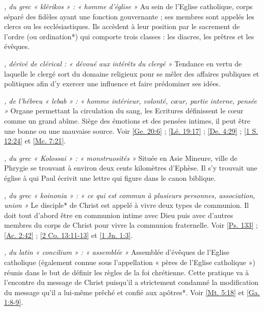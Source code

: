 \begin{multicols}{2}
\textit{, du grec « klêrikos » : « homme d'église »}\newline
Au sein de l'Eglise catholique, corps séparé des fidèles ayant une fonction gouvernante ; ses membres sont appelés les clercs ou les ecclésiastiques. Ils accèdent à leur position par le sacrement de l'ordre (ou ordination*) qui comporte trois classes : les diacres, les prêtres et les évêques.

\textit{, dérivé de clérical : « dévoué aux intérêts du clergé »}\newline
Tendance en vertu de laquelle le clergé sort du domaine religieux pour se mêler des affaires publiques et politiques afin d'y exercer une influence et faire prédominer ses idées.

\textit{, de l'hébreu « lebab » : « homme intérieur, volonté, cœur, partie interne, pensée »}\newline
Organe permettant la circulation du sang, les Ecritures définissent le cœur comme un grand abîme. Siège des émotions et des pensées intimes, il peut être une bonne ou une mauvaise source. Voir \vref{Ge. 20:6} ; \vref{Lé. 19:17} ; \vref{De. 4:29} ; \vref{1 S. 12:24} et \vref{Mc. 7:21}.

\textit{, du grec « Kolossai » : « monstruosités »}\newline
Située en Asie Mineure, ville de Phrygie se trouvant à environ deux cents kilomètres d'Ephèse. Il s'y trouvait une église à qui Paul écrivit une lettre qui figure dans le canon biblique.

\textit{, du grec « koinonia » : « ce qui est commun à plusieurs personnes, association, union »}\newline
Le disciple* de Christ est appelé à vivre deux types de communion. Il doit tout d'abord être en communion intime avec Dieu puis avec d'autres membres du corps de Christ pour vivre la communion fraternelle. Voir \vref{Ps. 133} ; \vref{Ac. 2:42} ; \vref{2 Co. 13:11-13} et \vref{1 Jn. 1:3}.

\textit{, du latin « concilium » : « assemblée »}\newline
Assemblée d'évêques de l'Eglise catholique (également connue sous l'appellation « pères de l'Eglise catholique ») réunis dans le but de définir les règles de la foi chrétienne. Cette pratique va à l'encontre du message de Christ puisqu'il a strictement condamné la modification du message qu'il a lui-même prêché et confié aux apôtres*. Voir \vref{Mt. 5:18} et \vref{Ga. 1:8-9}.


\end{multicols}
